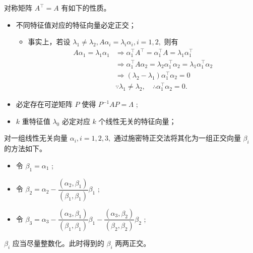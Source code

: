 对称矩阵 $ A^\top = A $ 有如下的性质。

\begin{itemize}
    \item 不同特征值对应的特征向量必定正交；
        \begin{itemize}
            \item 事实上，若设 $ \lambda_1\neq\lambda_2, A\alpha_i = \lambda_i\alpha_i, i = 1,2, $
            则有 
            \begin{equation*}
                \begin{aligned}
                    A\alpha_1 = \lambda_1\alpha_1  &\Rightarrow
                    \alpha_1^\top A^\top = \alpha_1^\top A = \lambda_1 \alpha_1^\top \\ 
                    &\Rightarrow \alpha_1^\top A\alpha_2 = \lambda_2\alpha_1^\top\alpha_2 
                    = \lambda_1\alpha_1^\top\alpha_2 \\ 
                    &\Rightarrow (\lambda_2 - \lambda_1) \alpha_1^\top\alpha_2 = 0\\ 
                    &\because \lambda_1 \neq \lambda_2, \quad
                    \therefore \alpha_1^\top \alpha_2 = 0.
                \end{aligned}
            \end{equation*}
        \end{itemize}
    \item 必定存在可逆矩阵 $ P $ 使得 $ P^{-1}AP = \Lambda $ ;
    \item $ k $ 重特征值 $ \lambda_0 $ 必定对应 $ k $ 个线性无关的特征向量；
\end{itemize}


对一组线性无关向量 $ \alpha_i,i = 1,2,3, $ 通过施密特正交法将其化为一组正交向量 $ \beta_i $ 的方法如下。

\begin{itemize}
    \item 令 $ \beta_1 = \alpha_1 $ ;
    \item 令 $ \beta_2 = \alpha_2 - \dfrac{(\alpha_2,\beta_1)}{(\beta_1,\beta_1)}\beta_1 $ ;
    \item 令 $ \beta_3 = \alpha_3 - \dfrac{(\alpha_3,\beta_1)}{(\beta_1,\beta_1)}\beta_1
    - \dfrac{(\alpha_3,\beta_2)}{(\beta_2,\beta_2)}\beta_2 $ ;
\end{itemize}

$ \beta_i $ 应当尽量整数化。此时得到的 $ \beta_i $ 两两正交。


